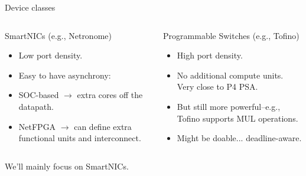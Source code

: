 \documentclass[aspectratio=169,xcolor={dvipsnames}
,handout
]{beamer}
\begin{document}
\begin{frame}{Device classes}
	\begin{columns}
		\begin{column}{0.5\linewidth}
			\alert{SmartNICs (e.g., Netronome)}
			
			\begin{itemize}[<+->]
				\item Low port density.
				\item Easy to have asynchrony:
				\item SOC-based $\rightarrow$ extra cores off the datapath.
				\item NetFPGA $\rightarrow$ can define extra functional units and interconnect.
			\end{itemize}
		\end{column}
		\begin{column}{0.5\linewidth}
			\alert{Programmable Switches (e.g., Tofino)}
			
			\begin{itemize}[<+->]
				\item High port density.
				\item No additional compute units. Very close to P4 PSA.
				\item But still more powerful--e.g., Tofino supports MUL operations.
				\item Might be doable... deadline-aware.
			\end{itemize}
		\end{column}
	\end{columns}

	\pause
	\vspace{1em}
	We'll mainly focus on SmartNICs.
\end{frame}
\end{document}
